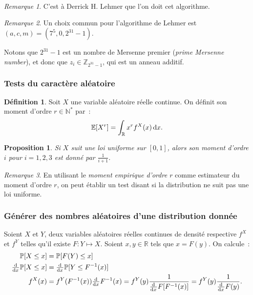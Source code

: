 \documentclass{article}
\newtheorem{prp}[thm]{Proposition}
\theoremstyle{definition}
\newtheorem{déf}[thm]{Définition}
\theoremstyle{remark}
\newtheorem*{rmq}{Remarque}
\renewcommand{\P}{\mathbb P}
\newcommand{\E}{\mathbb E}
\newcommand{\N}{\mathbb N}
\newcommand{\R}{\mathbb R}
\begin{document}
	\begin{rmq} C'est à Derrick H. Lehmer que l'on doit cet algorithme.
	\end{rmq}

	\begin{rmq} Un choix commun pour l'algorithme de Lehmer est $(a, c, m) = (7^5, 0, 2^{31}-1)$.

	Notons que $2^{31}-1$ est un nombre de Mersenne premier (\textit{prime Mersenne number}), et donc que $z_i \in \mathbb Z_{2^{31}-1}$, qui est un anneau additif.
	\end{rmq}

		\subsubsection{Tests du caractère aléatoire}

	\begin{déf} Soit $X$ une variable aléatoire réelle continue. On définit son moment d'ordre $r \in \N^*$ par~:
	\[\E[X^r] = \int_\R x^rf^X(x)\dif x.\]
	\end{déf}

	\begin{prp} Si $X$ suit une loi uniforme sur $[0, 1]$, alors son moment d'ordre $i$ pour $i=1, 2, 3$ est donné par $\frac 1{i+1}$.
	\end{prp}

	\begin{rmq} En utilisant le \textit{moment empirique d'ordre $r$} comme estimateur du moment d'ordre $r$, on peut établir un test disant si la distribution
	ne suit pas une loi uniforme.
	\end{rmq}

		\subsubsection{Générer des nombres aléatoires d'une distribution donnée}

	Soient $X$ et $Y$, deux variables aléatoires réelles continues de densité respective $f^X$ et $f^Y$ telles qu'il existe $F : Y \mapsto X$.
	Soient $x, y \in \R$ tels que $x = F(y)$. On calcule~:
	\begin{align*}
		\P[X \leq x] &= \P[F(Y) \leq x] \\
		\od {}x\P[X \leq x] &= \od {}x \P[Y \leq F^{-1}(x)] \\
		f^X(x) &= f^Y(F^{-1}(x))\od{}xF^{-1}(x) = f^Y(y)\frac 1{\od {}x F[F^{-1}(x)]} = f^Y(y)\frac 1{\od {}xF(y)}.
	\end{align*}
\end{document}
